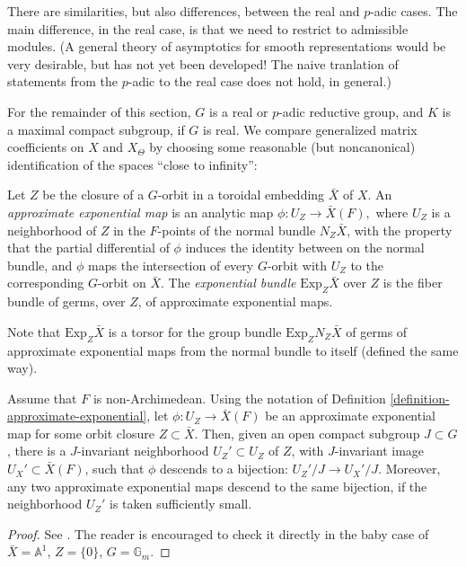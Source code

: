 There are similarities, but also differences, between the real and $p$-adic cases. The main difference, in the real case, is that we need to restrict to admissible modules. (A general theory of asymptotics for smooth representations would be very desirable, but has not yet been developed! The naive tranlation of statements from the $p$-adic to the real case does not hold, in general.)

For the remainder of this section, $G$ is a real or $p$-adic reductive group, and $K$ is a maximal compact subgroup, if $G$ is real. We compare generalized matrix coefficients on $X$ and $X_\Theta$ by choosing some reasonable (but noncanonical) identification of the spaces ``close to infinity'':

\begin{definition}
 \label{definition-approximate-exponential}
Let $Z$ be the closure of a $G$-orbit in a toroidal embedding $\bar X$ of $X$. An {\it approximate exponential map} is an analytic map $\phi: U_Z\to \bar X(F),$ where $U_Z$ is a neighborhood of $Z$ in the $F$-points of the normal bundle $N_Z \bar X$,  with the property that the partial differential of $\phi$ induces the identity between on the normal bundle, and $\phi$ maps the intersection of every $G$-orbit with $U_Z$ to the corresponding $G$-orbit on $\bar X$. The {\it exponential bundle} $\text{Exp}_Z \bar X$ over $Z$ is the fiber bundle of germs, over $Z$, of approximate exponential maps. 
\end{definition}

Note that $\text{Exp}_Z \bar X$ is a torsor for the group bundle $\text{Exp}_Z N_Z\bar X$ of germs of approximate exponential maps from the normal bundle to itself (defined the same way). 

\begin{proposition}
 \label{proposition-exponential-p-adic}
Assume that $F$ is non-Archimedean. Using the notation of Definition \ref{definition-approximate-exponential}, let $\phi: U_Z \to \bar X(F)$ be an approximate exponential map for some orbit closure $Z\subset \bar X$.  
Then, given an open compact subgroup $J\subset G$, there is a $J$-invariant neighborhood $U_Z'\subset U_Z$ of $Z$, with $J$-invariant image $U_X'\subset \bar X(F)$, such that $\phi$ descends to a bijection: $U_Z'/J\to U_X'/J$. Moreover, any two approximate exponential maps descend to the same bijection, if the neighborhood $U_Z'$ is taken sufficiently small.
\end{proposition}

\begin{proof}
 See \cite[Proposition 4.3.1]{Sakellaridis-Venkatesh}. The reader is encouraged to check it directly in the baby case of $\bar X=\mathbb A^1$, $Z=\{0\}$, $G=\mathbb G_m$.
\end{proof}

